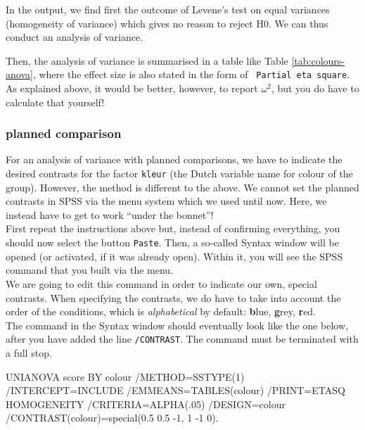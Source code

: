 \documentclass[
]{book}
\newenvironment{Shaded}{\begin{snugshade}}{\end{snugshade}}
\newcommand{\NormalTok}[1]{#1}
\begin{document}
In the output, we find first the outcome of Levene's test on equal
variances (homogeneity of variance) which gives no reason to reject
H0. We can thus conduct an analysis of variance.

Then, the analysis of variance is summarised in a table like Table
\ref{tab:colours-anova}, where the effect size is also stated in
the form of \texttt{~Partial\ eta\ square}.
As explained above, it would be better, however, to report
\(\omega^2\), but you do have to calculate that yourself!

\subsubsection{planned comparison}\label{planned-comparison}

For an analysis of variance with planned comparisons, we have to
indicate the desired contrasts for the factor \texttt{kleur}
(the Dutch variable name for colour of the group).
However, the method
is different to the above. We cannot set the planned contrasts in SPSS
via the menu system which we used until now. Here, we instead have
to get to work ``under the bonnet''!\\
First repeat the instructions above but, instead of confirming everything,
you should now select the button \texttt{Paste}. Then, a so-called Syntax window
will be opened (or activated, if it was already open). Within it, you
will see the SPSS command that you built via the menu.\\
We are going to edit this command in order to indicate our own, special
contrasts. When specifying the contrasts, we do have to take into
account the order of the conditions, which is \emph{alphabetical} by default: \textbf{b}lue, \textbf{g}rey,
\textbf{r}ed.\\
The command in the Syntax window should eventually look like the one
below, after you have added the line \texttt{/CONTRAST}. The command
must be terminated with a full stop.\\

\begin{Shaded}
\begin{Highlighting}[]
\NormalTok{UNIANOVA score BY colour}
\NormalTok{  /METHOD=SSTYPE(1)}
\NormalTok{  /INTERCEPT=INCLUDE}
\NormalTok{  /EMMEANS=TABLES(colour) }
\NormalTok{  /PRINT=ETASQ HOMOGENEITY}
\NormalTok{  /CRITERIA=ALPHA(.05)}
\NormalTok{  /DESIGN=colour}
\NormalTok{  /CONTRAST(colour)=special(0.5 0.5 {-}1, 1 {-}1 0).}
\end{Highlighting}
\end{Shaded}
\end{document}
